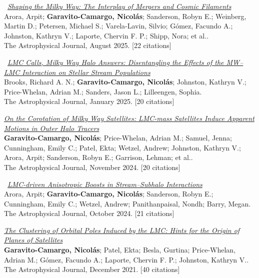 \documentclass[14pt]{article}
\begin{document}
\begin{etaremune}
\item \dag\ \textit{\href{https://ui.adsabs.harvard.edu/abs/2025ApJ...988..190A/abstract}{Shaping the Milky Way: The Interplay of Mergers and Cosmic Filaments}}\\
  {\small \color{darkgray} Arora, Arpit; \textbf{Garavito-Camargo, Nicolás}; Sanderson, Robyn E.; Weinberg, Martin D.; Petersen, Michael S.; Varela-Lavin, Silvio; Gómez, Facundo A.; Johnston, Kathryn V.; Laporte, Chervin F. P.; Shipp, Nora; et al..\\
  The Astrophysical Journal, August 2025. [22 citations]}

\item \dag\ \textit{\href{https://ui.adsabs.harvard.edu/abs/2025ApJ...978...79B/abstract}{LMC Calls, Milky Way Halo Answers: Disentangling the Effects of the MW--LMC Interaction on Stellar Stream Populations}}\\
  {\small \color{darkgray} Brooks, Richard A. N.; \textbf{Garavito-Camargo, Nicolás}; Johnston, Kathryn V.; Price-Whelan, Adrian M.; Sanders, Jason L.; Lilleengen, Sophia.\\
  The Astrophysical Journal, January 2025. [20 citations]}

\item \textit{\href{https://ui.adsabs.harvard.edu/abs/2024ApJ...975..100G/abstract}{On the Corotation of Milky Way Satellites: LMC-mass Satellites Induce Apparent Motions in Outer Halo Tracers}}\\
  {\small \color{darkgray} \textbf{Garavito-Camargo, Nicolás}; Price-Whelan, Adrian M.; Samuel, Jenna; Cunningham, Emily C.; Patel, Ekta; Wetzel, Andrew; Johnston, Kathryn V.; Arora, Arpit; Sanderson, Robyn E.; Garrison, Lehman; et al..\\
  The Astrophysical Journal, November 2024. [20 citations]}

\item \dag\ \textit{\href{https://ui.adsabs.harvard.edu/abs/2024ApJ...974..286A/abstract}{LMC-driven Anisotropic Boosts in Stream--Subhalo Interactions}}\\
  {\small \color{darkgray} Arora, Arpit; \textbf{Garavito-Camargo, Nicolás}; Sanderson, Robyn E.; Cunningham, Emily C.; Wetzel, Andrew; Panithanpaisal, Nondh; Barry, Megan.\\
  The Astrophysical Journal, October 2024. [21 citations]}

\item \textit{\href{https://ui.adsabs.harvard.edu/abs/2021ApJ...923..140G/abstract}{The Clustering of Orbital Poles Induced by the LMC: Hints for the Origin of Planes of Satellites}}\\
  {\small \color{darkgray} \textbf{Garavito-Camargo, Nicolás}; Patel, Ekta; Besla, Gurtina; Price-Whelan, Adrian M.; Gómez, Facundo A.; Laporte, Chervin F. P.; Johnston, Kathryn V..\\
  The Astrophysical Journal, December 2021. [40 citations]}


\end{etaremune}
\end{document}
